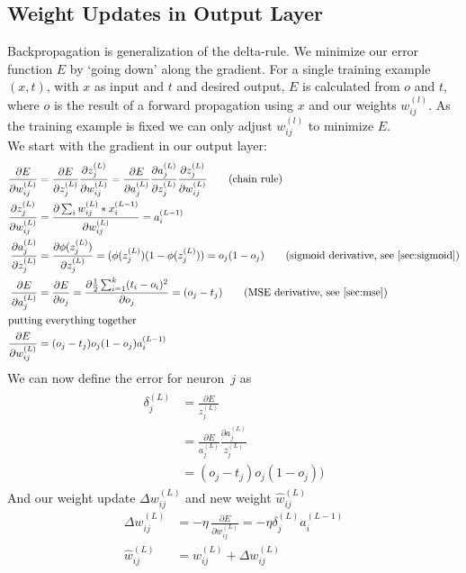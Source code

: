 \subsection{Weight Updates in Output Layer}
Backpropagation is generalization of the delta-rule. We minimize our error function $E$ by `going down' along the gradient. For a single training example~$(x, t)$, with $x$ as input and $t$ and desired output, $E$ is calculated from $o$ and $t$, where $o$ is the result of a forward propagation using $x$ and our weights $w_{ij}^{(l)}$. As the training example is fixed we can only adjust $w_{ij}^{(l)}$ to minimize $E$.\\
We start with the gradient in our output layer:
\begin{align}
\frac{\partial E}{\partial w_{ij}^{(L)}} &= \frac{\partial E}{\partial z_j^{(L)}} \frac{\partial z_j^{(L)}}{\partial w_{ij}^{(L)}}
= \frac{\partial E}{\partial a_j^{(L)}} \frac{\partial a_j^{(L)}}{\partial z_j^{(L)}} \frac{\partial z_j^{(L)}}{\partial w_{ij}^{(L)}}
 \tag{chain rule}\\
\frac{\partial z_j^{(L)}}{\partial w_{ij}^{(L)}} &= \frac{\partial \sum_i w_{ij}^{(L)} * x_i^{(L-1)} }{\partial w_{ij}^{(L)}}
= a_i^{(L-1)}\\
\frac{\partial a_j^{(L)}}{\partial z_j^{(L)}} &= \frac{\partial \phi(z_j^{(L)})}{\partial z_j^{(L)}}
= (\phi(z_j^{(L)}) (1 - \phi(z_j^{(L)}))
= o_j (1 - o_j) \tag{sigmoid derivative, see \ref{sec:sigmoid}} \\
\frac{\partial E}{\partial a_j^{(L)}} &= \frac{\partial E}{\partial o_j}
= \frac{\partial \half \sum_{i=1}^k (t_i - o_i)^2}{\partial o_j}
= (o_j - t_j) \tag{MSE derivative, see \ref{sec:mse}}\\
\intertext{putting everything together}
\frac{\partial E}{\partial w_{ij}^{(L)}} &= (o_j - t_j) o_j (1 - o_j) a_i^{(L-1)}
\end{align}
We can now define the error for neuron~$j$ as
\begin{align}
\begin{split}
\delta_j^{(L)} &= \frac{\partial E}{z_j^{(L)}}\\
&= \frac{\partial E}{a_j^{(L)}} \frac{\partial a_j^{(L)}}{z_j^{(L)}}\\
&= (o_j - t_j) o_j (1 - o_j))
\end{split}
\end{align}
And our weight update $\Delta w_{ij}^{(L)}$ and new weight $\hat w_{ij}^{(L)}$
\begin{align}
\Delta w_{ij}^{(L)} &= - \eta\, \frac{\partial E}{\partial w_{ij}^{(L)}}
= - \eta \delta_j^{(L)} a_i^{(L-1)}\\
\hat w_{ij}^{(L)} &= w_{ij}^{(L)} + \Delta w_{ij}^{(L)}
\end{align}


